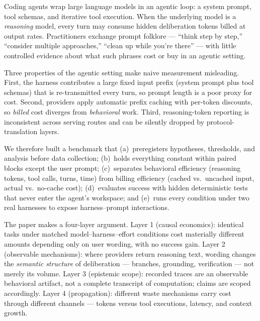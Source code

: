 \documentclass[11pt]{article}
\begin{document}
Coding agents wrap large language models in an agentic loop: a system
prompt, tool schemas, and iterative tool execution. When the underlying
model is a \emph{reasoning} model, every turn may consume hidden
deliberation tokens billed at output rates. Practitioners exchange prompt
folklore --- ``think step by step,'' ``consider multiple approaches,''
``clean up while you're there'' --- with little controlled evidence about
what such phrases cost or buy in an agentic setting.

Three properties of the agentic setting make naive measurement misleading.
First, the harness contributes a large fixed input prefix (system prompt
plus tool schemas) that is re-transmitted every turn, so prompt length is a
poor proxy for cost. Second, providers apply automatic prefix caching with
per-token discounts, so \emph{billed} cost diverges from \emph{behavioral}
work. Third, reasoning-token reporting is inconsistent across serving
routes and can be silently dropped by protocol-translation layers.

We therefore built a benchmark that (a)~preregisters hypotheses,
thresholds, and analysis before data collection; (b)~holds everything
constant within paired blocks except the user prompt; (c)~separates
behavioral efficiency (reasoning tokens, tool calls, turns, time) from
billing efficiency (cached vs.\ uncached input, actual vs.\ no-cache
cost); (d)~evaluates success with hidden deterministic tests that never
enter the agent's workspace; and (e)~runs every condition under two real
harnesses to expose harness--prompt interactions.

The paper makes a four-layer argument. Layer 1 (causal economics):
identical tasks under matched model--harness--effort conditions cost
materially different amounts depending only on user wording, with no
success gain. Layer 2 (observable mechanisms): where providers return
reasoning text, wording changes the \emph{semantic structure} of
deliberation --- branches, grounding, verification --- not merely its
volume. Layer 3 (epistemic scope): recorded traces are an observable
behavioral artifact, not a complete transcript of computation; claims are
scoped accordingly. Layer 4 (propagation): different waste mechanisms
carry cost through different channels --- tokens versus tool executions,
latency, and context growth.
\end{document}
